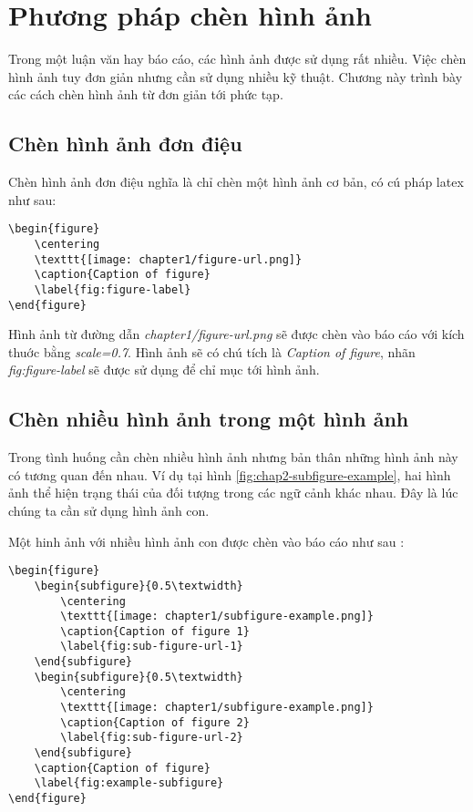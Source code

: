 \chapter{Phương pháp chèn hình ảnh}

Trong một luận văn hay báo cáo, các hình ảnh được sử dụng rất nhiều. Việc chèn hình ảnh tuy đơn giản nhưng cần sử dụng nhiều kỹ thuật. Chương này trình bày các cách chèn hình ảnh từ đơn giản tới phức tạp.

\section{Chèn hình ảnh đơn điệu}

Chèn hình ảnh đơn điệu nghĩa là chỉ chèn một hình ảnh cơ bản, có cú pháp latex như sau:

\begin{lstlisting}[language={[LaTeX]TeX}, caption={Chèn một hình ảnh vào báo cáo}, label={lst:figure}]
\begin{figure}
    \centering
    \texttt{[image: chapter1/figure-url.png]}
    \caption{Caption of figure}
    \label{fig:figure-label}
\end{figure}
\end{lstlisting}

Hình ảnh từ đường dẫn \textit{chapter1/figure-url.png} sẽ được chèn vào báo cáo với kích thuớc bằng \textit{scale=0.7}. Hình ảnh sẽ có chú tích là \textit{Caption of figure}, nhãn \textit{fig:figure-label} sẽ được sử dụng để chỉ mục tới hình ảnh.

\section{Chèn nhiều hình ảnh trong một hình ảnh}

Trong tình huống cần chèn nhiều hình ảnh nhưng bản thân những hình ảnh này có tương quan đến nhau. Ví dụ tại hình \ref{fig:chap2-subfigure-example}, hai hình ảnh thể hiện trạng thái của đối tượng trong các ngữ cảnh khác nhau. Đây là lúc chúng ta cần sử dụng hình ảnh con.

Một hinh ảnh với nhiều hình ảnh con được chèn vào báo cáo như sau \cite{ShantoLatex} :

\begin{lstlisting}[language={[LaTeX]TeX}, caption={Chèn một hình ảnh vào báo cáo}, label={lst:example-subfigure}]
\begin{figure}
    \begin{subfigure}{0.5\textwidth}
        \centering
        \texttt{[image: chapter1/subfigure-example.png]}
        \caption{Caption of figure 1}
        \label{fig:sub-figure-url-1}
    \end{subfigure}
    \begin{subfigure}{0.5\textwidth}
        \centering
        \texttt{[image: chapter1/subfigure-example.png]}
        \caption{Caption of figure 2}
        \label{fig:sub-figure-url-2}
    \end{subfigure}
    \caption{Caption of figure}
    \label{fig:example-subfigure}
\end{figure}
      
\end{lstlisting}

